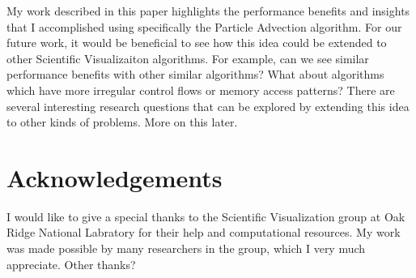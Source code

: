 \documentclass{IEEEtran}
\begin{document}
My work described in this paper highlights the performance benefits and insights that I accomplished using specifically the Particle Advection algorithm.
%
For our future work, it would be beneficial to see how this idea could be extended to other Scientific Visualizaiton algorithms.
%
For example, can we see similar performance benefits with other similar algorithms?
%
What about algorithms which have more irregular control flows or memory access patterns?
%
There are several interesting research questions that can be explored by extending this idea to other kinds of problems.
%
More on this later.
%
\section{Acknowledgements}
I would like to give a special thanks to the Scientific Visualization group at Oak Ridge National Labratory for their help and computational resources.
%
My work was made possible by many researchers in the group, which I very much appreciate.
%
Other thanks?



\end{document}
